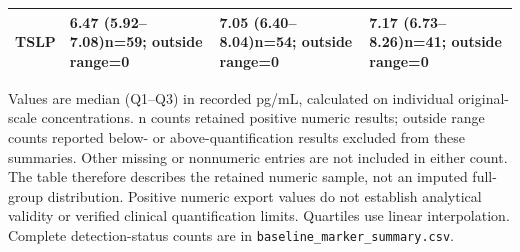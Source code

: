 {\begin{longtable}{p{22mm}p{45mm}p{45mm}p{45mm}}
TSLP & 6.47 (5.92--7.08)\newline n=59; outside range=0 & 7.05 (6.40--8.04)\newline n=54; outside range=0 & 7.17 (6.73--8.26)\newline n=41; outside range=0 \\[4pt]
\bottomrule\end{longtable}
Values are median (Q1--Q3) in recorded pg/mL, calculated on individual original-scale concentrations. n counts retained positive numeric results; outside range counts reported below- or above-quantification results excluded from these summaries. Other missing or nonnumeric entries are not included in either count. The table therefore describes the retained numeric sample, not an imputed full-group distribution. Positive numeric export values do not establish analytical validity or verified clinical quantification limits. Quartiles use linear interpolation. Complete detection-status counts are in \texttt{baseline\_marker\_summary.csv}.
}
